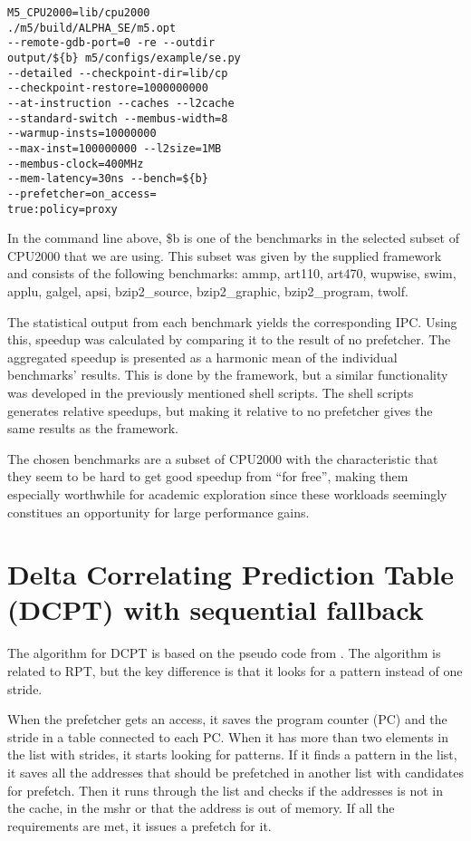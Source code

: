 \documentclass[12pt,journal,compsoc]{IEEEtran}
\begin{document}
\begin{verbatim}
M5_CPU2000=lib/cpu2000
./m5/build/ALPHA_SE/m5.opt
--remote-gdb-port=0 -re --outdir
output/${b} m5/configs/example/se.py
--detailed --checkpoint-dir=lib/cp
--checkpoint-restore=1000000000
--at-instruction --caches --l2cache
--standard-switch --membus-width=8
--warmup-insts=10000000
--max-inst=100000000 --l2size=1MB
--membus-clock=400MHz
--mem-latency=30ns --bench=${b}
--prefetcher=on_access=
true:policy=proxy
\end{verbatim}

In the command line above, \${b} is one of the benchmarks in the selected
subset of CPU2000 that we are using. This subset was given by the supplied
framework and consists of the following benchmarks: ammp, art110, art470,
wupwise, swim, applu, galgel, apsi, bzip2\_source, bzip2\_graphic,
bzip2\_program, twolf.

The statistical output from each benchmark yields the corresponding
IPC. Using this, speedup was calculated by comparing it to the result
of no prefetcher. The aggregated speedup is presented as a harmonic mean of
the individual benchmarks' results. This is done by the framework, but a
similar functionality was developed in the previously mentioned shell scripts.
The shell scripts generates relative speedups, but making it relative to no
prefetcher gives the same results as the framework.

The chosen benchmarks are a subset of CPU2000 with the characteristic that
they seem to be hard to get good speedup from ``for free'', making
them especially worthwhile for academic exploration since these workloads
seemingly constitues an opportunity for large performance gains.

\section{Delta Correlating Prediction Table (DCPT) with sequential fallback}
The algorithm for DCPT is based on the pseudo code from \cite{dcptpaper}.
The algorithm is related to RPT, but the key difference is that it looks for a pattern instead of one stride.

When the prefetcher gets an access, it saves the program counter (PC) and the stride in a table connected to each PC. When it has more than two elements in the list with strides, it starts looking for patterns.
If it finds a pattern in the list, it saves all the addresses that should be prefetched in another list with candidates for prefetch.
Then it runs through the list and checks if the addresses is not in the cache, in the mshr or that the address is out of memory. If all the requirements are met, it issues a prefetch for it.
\end{document}
